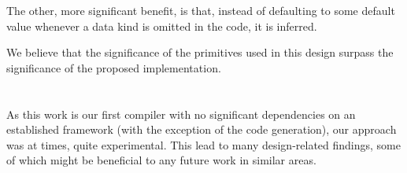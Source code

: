 The other, more significant benefit, is that, instead of defaulting to some default value whenever a data kind is omitted in the \cmm code, it is inferred.

We believe that the significance of the primitives used in this design surpass the significance of the proposed implementation. 

\section{}

As this work is our first compiler with no significant dependencies on an established framework (with the exception of the code generation), our approach was at times, quite experimental. This lead to many design-related findings, some of which might be beneficial to any future work in similar areas.

